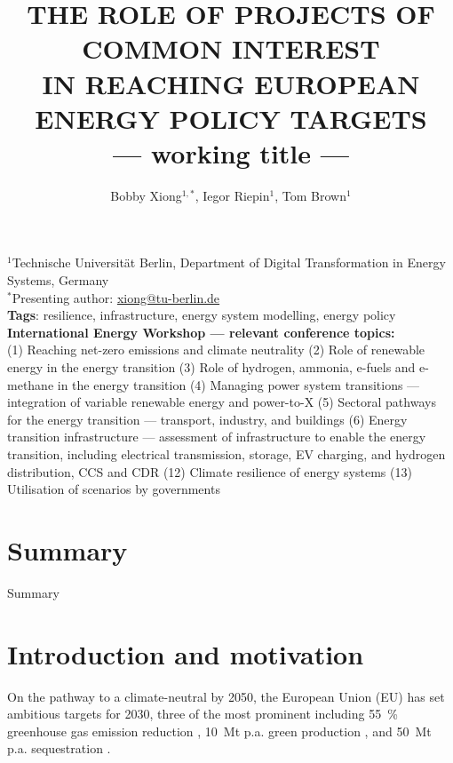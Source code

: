 \documentclass[10pt]{article}
\title{\renewcommand{\baselinestretch}{1.17}\normalsize\bf%
\uppercase{The Role of Projects of Common Interest\\in Reaching European Energy Policy Targets}\\--- working title ---
}
\author{%
Bobby Xiong$^{1,*}$, Iegor Riepin$^{1}$, Tom Brown$^{1}$\\ 
}
\date{}
\let\autocite\cite
\begin{document}
\maketitle

\vspace{-1cm}

\begin{center}
{\footnotesize 
$^1$Technische Universität Berlin, Department of Digital Transformation in Energy Systems, Germany \\
$^*$Presenting author: \href{mailto:xiong@tu-berlin.de}{xiong@tu-berlin.de}
}\\
\smallskip
\footnotesize
\textbf{Tags}: resilience, infrastructure, energy system modelling, energy policy \\
\medskip
\textbf{ International Energy Workshop --- relevant conference topics:}\\(1) Reaching net-zero emissions and climate neutrality \textbullet{} (2) Role of renewable energy in the energy transition \textbullet{} (3) Role of hydrogen, ammonia, e-fuels and e-methane in the energy transition \textbullet{} (4) Managing power system transitions --- integration of variable renewable energy and power-to-X \textbullet{} (5) Sectoral pathways for the energy transition --- transport, industry, and buildings \textbullet{} (6) Energy transition infrastructure --- assessment of infrastructure to enable the energy transition, including electrical transmission, storage, EV charging, and hydrogen distribution, CCS and CDR \textbullet{} (12) Climate resilience of energy systems \textbullet{} (13) Utilisation of scenarios by governments
\end{center}


\section*{Summary}

Summary

\section*{Introduction and motivation}

On the pathway to a climate-neutral by 2050, the European Union (EU) has set ambitious targets for 2030, three of the most prominent including \SI{55}{\percent} greenhouse gas emission reduction \autocite{europeancommissionFit55Delivering2021}, \SI{10}{Mt} p.a. green  production \autocite{europeancommissionREPowerEUPlanCommunication2022}, and \SI{50}{Mt} p.a.  sequestration \autocite{europeanparliamentRegulationEU20242024}. 
\end{document}
